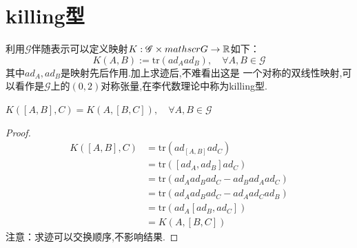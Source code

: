 \documentclass[../main.tex]{subfiles}
\begin{document}
\section{killing型}
利用$\mathscr{G}$伴随表示可以定义映射$K:\mathscr{G}\times \\mathscr{G} \rightarrow \mathbb{R}$如下：
$$
	K(A,B):= \text{tr}(ad_A ad_B),\quad \forall A,B \in \mathscr{G}$$ 其中$ad_A,ad_B$是映射先后作用.加上求迹后,不难看出这是
一个对称的双线性映射,可以看作是$\mathscr{G}$上的$(0,2)$对称张量,在李代数理论中称为killing型.
\begin{theorem}
	$K([A,B],C) = K(A,[B,C]),\quad \forall A,B \in \mathscr{G}$
\end{theorem}
\begin{proof}
	\begin{align*}
		K([A,B],C) & = \text{tr}(ad_{[A,B]}ad_C)                  \\
		           & = \text{tr}([ad_A,ad_B]ad_C)                 \\
		           & = \text{tr}(ad_A ad_B ad_C - ad_B ad_A ad_C) \\
		           & = \text{tr}(ad_A ad_B ad_C - ad_A ad_C ad_B) \\
		           & = \text{tr}(ad_A[ad_B,ad_C])                 \\
		           & = K(A,[B,C])
	\end{align*}
	注意：求迹可以交换顺序,不影响结果.
\end{proof}
\end{document}
